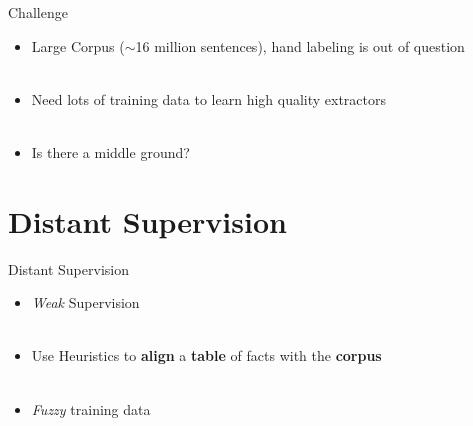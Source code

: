 \documentclass{beamer}
\begin{document}
\begin{frame}{Challenge}
 \begin{itemize}
  \item Large Corpus ($\sim$16 million sentences), hand labeling is out of question \pause \\~\\
  \item Need lots of training data to learn high quality extractors \pause \\~\\
  \item Is there a middle ground?
 \end{itemize}
\end{frame}

\section{Distant Supervision}
\begin{frame}{Distant Supervision} \pause 
\begin{itemize}
 
 \item  \emph{Weak} Supervision\pause \\~\\
  \item Use Heuristics to \textbf{align} a \textbf{table} of facts with the \textbf{corpus}  \pause \\~\\
  \item \emph{Fuzzy} training data 
  
\end{itemize}
\end{frame}
\end{document}
